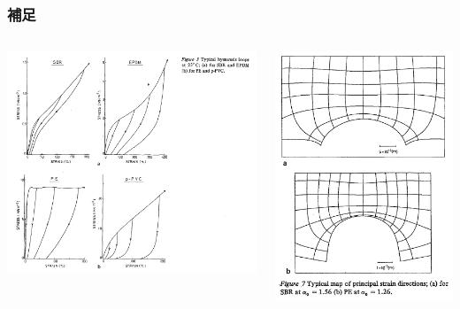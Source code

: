 \documentclass[11pt, dvipdfmx]{beamer}
\begin{document}
\begin{frame}
\frametitle{補足}

\begin{columns}[T, totalwidth=0.96\linewidth]

\includegraphics[width=\columnwidth]{fig/hysterisis_roop.png}

\includegraphics[width=\columnwidth]{fig/Typical_map.png}
\end{columns}


\end{frame}
\end{document}
